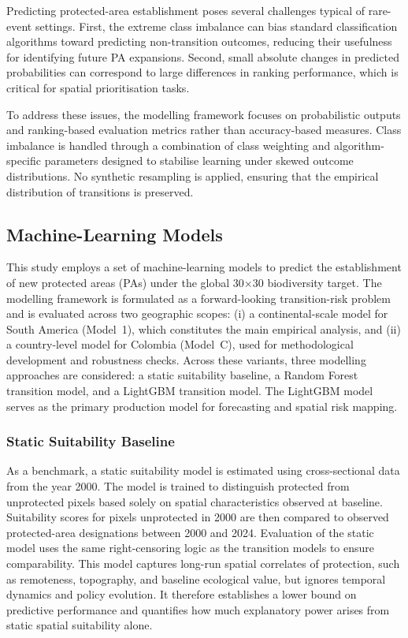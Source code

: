 \documentclass[12pt]{article}
\theoremstyle{break} %
\begin{document}
Predicting protected-area establishment poses several challenges typical of rare-event settings. First, the extreme class imbalance can bias standard classification algorithms toward predicting non-transition outcomes, reducing their usefulness for identifying future PA expansions. Second, small absolute changes in predicted probabilities can correspond to large differences in ranking performance, which is critical for spatial prioritisation tasks. 

To address these issues, the modelling framework focuses on probabilistic outputs and ranking-based evaluation metrics rather than accuracy-based measures. Class imbalance is handled through a combination of class weighting and algorithm-specific parameters designed to stabilise learning under skewed outcome distributions. No synthetic resampling is applied, ensuring that the empirical distribution of transitions is preserved.

\subsection{Machine-Learning Models}
\label{models}

This study employs a set of machine-learning models to predict the establishment of new protected areas (PAs) under the global 30$\times$30 biodiversity target. The modelling framework is formulated as a forward-looking transition-risk problem and is evaluated across two geographic scopes: (i) a continental-scale model for South America (Model~1), which constitutes the main empirical analysis, and (ii) a country-level model for Colombia (Model~C), used for methodological development and robustness checks. Across these variants, three modelling approaches are considered: a static suitability baseline, a Random Forest transition model, and a LightGBM transition model. The LightGBM model serves as the primary production model for forecasting and spatial risk mapping.


\subsubsection{Static Suitability Baseline}
\label{static}

As a benchmark, a static suitability model is estimated using cross-sectional data from the year 2000. The model is trained to distinguish protected from unprotected pixels based solely on spatial characteristics observed at baseline. Suitability scores for pixels unprotected in 2000 are then compared to observed protected-area designations between 2000 and 2024. Evaluation of the static model uses the same right-censoring logic as the transition models to ensure comparability. This model captures long-run spatial correlates of protection, such as remoteness, topography, and baseline ecological value, but ignores temporal dynamics and policy evolution. It therefore establishes a lower bound on predictive performance and quantifies how much explanatory power arises from static spatial suitability alone.
\end{document}
